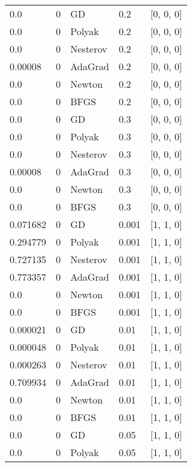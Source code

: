 \begin{tabular}{lllll}
      0.0 &        0 &       GD &    0.2 &        [0, 0, 0] \\
      0.0 &        0 &   Polyak &    0.2 &        [0, 0, 0] \\
      0.0 &        0 & Nesterov &    0.2 &        [0, 0, 0] \\
  0.00008 &        0 &  AdaGrad &    0.2 &        [0, 0, 0] \\
      0.0 &        0 &   Newton &    0.2 &        [0, 0, 0] \\
      0.0 &        0 &     BFGS &    0.2 &        [0, 0, 0] \\
      0.0 &        0 &       GD &    0.3 &        [0, 0, 0] \\
      0.0 &        0 &   Polyak &    0.3 &        [0, 0, 0] \\
      0.0 &        0 & Nesterov &    0.3 &        [0, 0, 0] \\
  0.00008 &        0 &  AdaGrad &    0.3 &        [0, 0, 0] \\
      0.0 &        0 &   Newton &    0.3 &        [0, 0, 0] \\
      0.0 &        0 &     BFGS &    0.3 &        [0, 0, 0] \\
 0.071682 &        0 &       GD &  0.001 &        [1, 1, 0] \\
 0.294779 &        0 &   Polyak &  0.001 &        [1, 1, 0] \\
 0.727135 &        0 & Nesterov &  0.001 &        [1, 1, 0] \\
 0.773357 &        0 &  AdaGrad &  0.001 &        [1, 1, 0] \\
      0.0 &        0 &   Newton &  0.001 &        [1, 1, 0] \\
      0.0 &        0 &     BFGS &  0.001 &        [1, 1, 0] \\
 0.000021 &        0 &       GD &   0.01 &        [1, 1, 0] \\
 0.000048 &        0 &   Polyak &   0.01 &        [1, 1, 0] \\
 0.000263 &        0 & Nesterov &   0.01 &        [1, 1, 0] \\
 0.709934 &        0 &  AdaGrad &   0.01 &        [1, 1, 0] \\
      0.0 &        0 &   Newton &   0.01 &        [1, 1, 0] \\
      0.0 &        0 &     BFGS &   0.01 &        [1, 1, 0] \\
      0.0 &        0 &       GD &   0.05 &        [1, 1, 0] \\
      0.0 &        0 &   Polyak &   0.05 &        [1, 1, 0] \\

\end{tabular}
